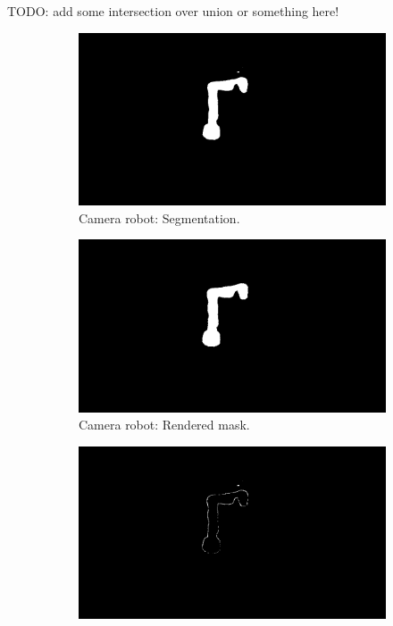 TODO: add some intersection over union or something here!


\begin{figure}
    \centering
    \begin{subfigure}[b]{0.32\textwidth}
        \includegraphics[width=\textwidth]{chapter_1/img/hsi_left_mask_2.png}
        \caption{Camera robot: Segmentation.}
    \end{subfigure}
    \begin{subfigure}[b]{0.32\textwidth}
        \includegraphics[width=\textwidth]{chapter_1/img/hsi_left_render_mask_2.png}
        \caption{Camera robot: Rendered mask.}
    \end{subfigure}
    \begin{subfigure}[b]{0.32\textwidth}
        \includegraphics[width=\textwidth]{chapter_1/img/hsi_left_difference_2.png}

\end{subfigure}
\end{figure}
